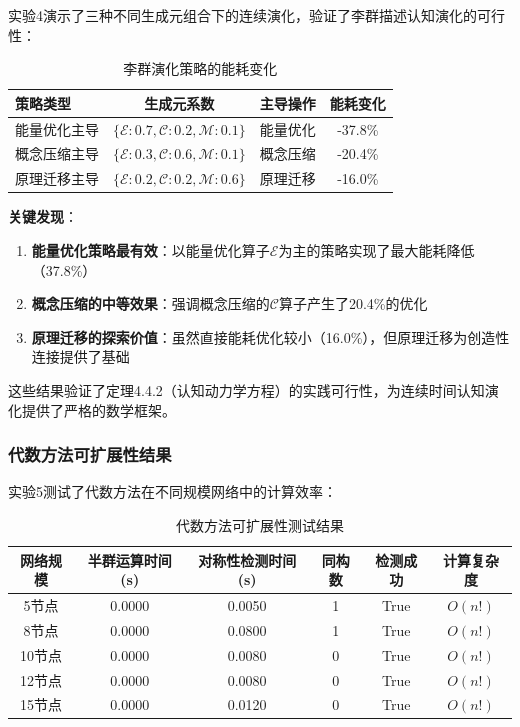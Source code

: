 \documentclass[12pt,a4paper]{article}
\begin{document}
实验4演示了三种不同生成元组合下的连续演化，验证了李群描述认知演化的可行性：

\begin{table}[H]
\centering
\caption{李群演化策略的能耗变化}
\label{tab:lie_group_results}
\begin{tabular}{p{3cm}cp{3cm}c}
\toprule
\textbf{策略类型} & \textbf{生成元系数} & \textbf{主导操作} & \textbf{能耗变化} \\
\midrule
能量优化主导 & $\{\mathcal{E}:0.7, \mathcal{C}:0.2, \mathcal{M}:0.1\}$ & 能量优化 & -37.8\% \\
概念压缩主导 & $\{\mathcal{E}:0.3, \mathcal{C}:0.6, \mathcal{M}:0.1\}$ & 概念压缩 & -20.4\% \\
原理迁移主导 & $\{\mathcal{E}:0.2, \mathcal{C}:0.2, \mathcal{M}:0.6\}$ & 原理迁移 & -16.0\% \\
\bottomrule
\end{tabular}
\end{table}

\textbf{关键发现}：
\begin{enumerate}
    \item \textbf{能量优化策略最有效}：以能量优化算子$\mathcal{E}$为主的策略实现了最大能耗降低（37.8\%）
    \item \textbf{概念压缩的中等效果}：强调概念压缩的$\mathcal{C}$算子产生了20.4\%的优化
    \item \textbf{原理迁移的探索价值}：虽然直接能耗优化较小（16.0\%），但原理迁移为创造性连接提供了基础
\end{enumerate}

这些结果验证了定理4.4.2（认知动力学方程）的实践可行性，为连续时间认知演化提供了严格的数学框架。

\subsubsection{代数方法可扩展性结果}
\label{subsubsec:scalability_results}

实验5测试了代数方法在不同规模网络中的计算效率：

\begin{table}[H]
\centering
\caption{代数方法可扩展性测试结果}
\label{tab:scalability_results}
\begin{tabular}{cccccc}
\toprule
\textbf{网络规模} & \textbf{半群运算时间(s)} & \textbf{对称性检测时间(s)} & \textbf{同构数} & \textbf{检测成功} & \textbf{计算复杂度} \\
\midrule
5节点 & 0.0000 & 0.0050 & 1 & True & $O(n!)$ \\
8节点 & 0.0000 & 0.0800 & 1 & True & $O(n!)$ \\
10节点 & 0.0000 & 0.0080 & 0 & True & $O(n!)$ \\
12节点 & 0.0000 & 0.0080 & 0 & True & $O(n!)$ \\
15节点 & 0.0000 & 0.0120 & 0 & True & $O(n!)$ \\
\bottomrule
\end{tabular}
\end{table}
\end{document}
